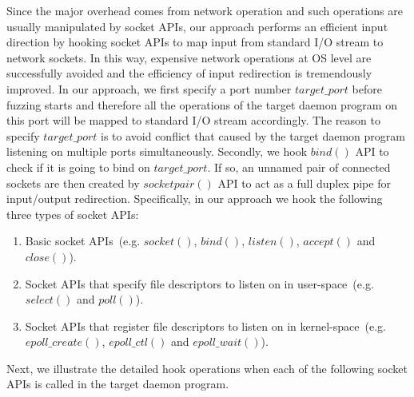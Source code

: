 Since the major overhead comes from network operation and such operations are usually manipulated by socket APIs, our approach performs an efficient input direction by hooking socket APIs to map input from standard I/O stream to network sockets. In this way, expensive network operations at OS level are successfully avoided and the efficiency of input redirection is tremendously improved. In our approach, we first specify a port number $target\_port$ before fuzzing starts and therefore all the operations of the target daemon program on this port will be mapped to standard I/O stream accordingly. The reason to specify $target\_port$ is to avoid conflict that caused by the target daemon program listening on multiple ports simultaneously. Secondly, we hook $bind()$ API to check if it is going to bind on $target\_port$. If so, an unnamed pair of connected sockets are then created by $socketpair()$ API to act as a full duplex pipe for input/output redirection. Specifically, in our approach we hook the following three types of socket APIs:

\begin{enumerate}
\item Basic socket APIs~(e.g. $socket()$, $bind()$, $listen()$, $accept()$ and $close()$).
\item Socket APIs that specify file descriptors to listen on in user-space~(e.g. $select()$ and $poll()$). 
\item Socket APIs that register file descriptors to listen on in kernel-space~(e.g. $epoll\_create()$, $epoll\_ctl()$ and $epoll\_wait()$).
\end{enumerate}

Next, we illustrate the detailed hook operations when each of the following socket APIs is called in the target daemon program.

